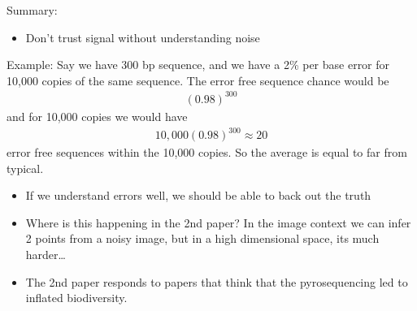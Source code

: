 \documentclass[../main.tex]{subfiles}
\begin{document}
Summary:
\begin{itemize}
    \item Don't trust signal without understanding noise
\end{itemize}
Example: Say we have 300 bp sequence, and we have a 2\% per base error for 10,000 copies of the same sequence.
The error free sequence chance would be
\begin{align*}
    (0.98)^{300} 
\end{align*}
and for 10,000 copies we would have
\begin{align*}
    10,000 (0.98)^{300} \approx 20
\end{align*}
error free sequences within the 10,000 copies. So the average is equal to far from typical.
\begin{itemize}
    \item If we understand errors well, we should be able to back out the truth
    \item Where is this happening in the 2nd paper? In the image context we can infer 2 points from
    a noisy image, but in a high dimensional space, its much harder\dots
    \item The 2nd paper responds to papers that think that the pyrosequencing led to inflated biodiversity.
\end{itemize}
\end{document}
